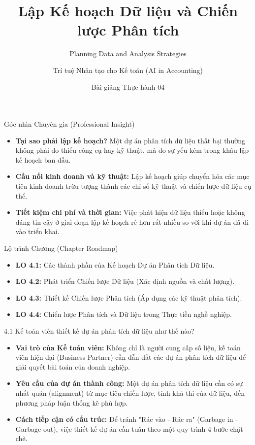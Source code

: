 \documentclass[aspectratio=169,12pt]{beamer}
\title[Thực hành - Chương 04]{Lập Kế hoạch Dữ liệu và Chiến lược Phân tích}
\subtitle{Planning Data and Analysis Strategies}
\author[Giảng viên]{Trí tuệ Nhân tạo cho Kế toán (AI in Accounting)}
\institute[Đại học]{Khoa Kế toán - Kiểm toán}
\date{Bài giảng Thực hành 04}
\begin{document}
\begin{frame}
    \titlepage
\end{frame}

\begin{frame}{Góc nhìn Chuyên gia (Professional Insight)}
\begin{itemize}
    \item \textbf{Tại sao phải lập kế hoạch?} Một dự án phân tích dữ liệu thất bại thường không phải do thiếu công cụ hay kỹ thuật, mà do sự yếu kém trong khâu lập kế hoạch ban đầu.
    \item \textbf{Cầu nối kinh doanh và kỹ thuật:} Lập kế hoạch giúp chuyển hóa các mục tiêu kinh doanh trừu tượng thành các chỉ số kỹ thuật và chiến lược dữ liệu cụ thể.
    \item \textbf{Tiết kiệm chi phí và thời gian:} Việc phát hiện dữ liệu thiếu hoặc không đáng tin cậy ở giai đoạn lập kế hoạch rẻ hơn rất nhiều so với khi dự án đã đi vào triển khai.
\end{itemize}
\end{frame}

\begin{frame}{Lộ trình Chương (Chapter Roadmap)}
\begin{itemize}
    \item \textbf{LO 4.1:} Các thành phần của Kế hoạch Dự án Phân tích Dữ liệu.
    \item \textbf{LO 4.2:} Phát triển Chiến lược Dữ liệu (Xác định nguồn và chất lượng).
    \item \textbf{LO 4.3:} Thiết kế Chiến lược Phân tích (Áp dụng các kỹ thuật phân tích).
    \item \textbf{LO 4.4:} Chiến lược Phân tích và Dữ liệu trong Thực tiễn nghề nghiệp.
\end{itemize}
\end{frame}

\begin{frame}{4.1 Kế toán viên thiết kế dự án phân tích dữ liệu như thế nào?}
\begin{itemize}
    \item \textbf{Vai trò của Kế toán viên:} Không chỉ là người cung cấp số liệu, kế toán viên hiện đại (Business Partner) cần dẫn dắt các dự án phân tích dữ liệu để giải quyết bài toán của doanh nghiệp.
    \item \textbf{Yêu cầu của dự án thành công:} Một dự án phân tích dữ liệu cần có sự nhất quán (alignment) từ mục tiêu chiến lược, tính khả thi của dữ liệu, đến phương pháp luận thống kê phù hợp.
    \item \textbf{Cách tiếp cận có cấu trúc:} Để tránh "Rác vào - Rác ra" (Garbage in - Garbage out), việc thiết kế dự án cần tuân theo một quy trình 4 bước chặt chẽ.
\end{itemize}
\end{frame}
\end{document}
